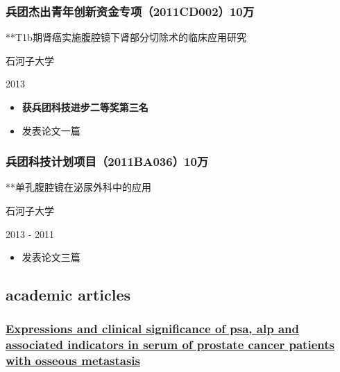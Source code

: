 \documentclass[]{article}
\providecommand{\tightlist}{%
  \setlength{\itemsep}{0pt}\setlength{\parskip}{0pt}}
\begin{document}
\hypertarget{ux5175ux56e2ux6770ux51faux9752ux5e74ux521bux65b0ux8d44ux91d1ux4e13ux98792011cd00210ux4e07}{%
\subsubsection{兵团杰出青年创新资金专项（2011CD002）10万}\label{ux5175ux56e2ux6770ux51faux9752ux5e74ux521bux65b0ux8d44ux91d1ux4e13ux98792011cd00210ux4e07}}

**T1b期肾癌实施腹腔镜下肾部分切除术的临床应用研究

石河子大学

2013

\begin{itemize}
\tightlist
\item
  \textbf{获兵团科技进步二等奖第三名}
\item
  发表论文一篇
\end{itemize}

\hypertarget{ux5175ux56e2ux79d1ux6280ux8ba1ux5212ux9879ux76ee2011ba03610ux4e07}{%
\subsubsection{兵团科技计划项目（2011BA036）10万}\label{ux5175ux56e2ux79d1ux6280ux8ba1ux5212ux9879ux76ee2011ba03610ux4e07}}

**单孔腹腔镜在泌尿外科中的应用

石河子大学

2013 - 2011

\begin{itemize}
\tightlist
\item
  发表论文三篇
\end{itemize}

\hypertarget{academic-articles}{%
\subsection{academic articles}\label{academic-articles}}

\hypertarget{expressions-and-clinical-significance-of-psa-alp-and-associated-indicators-in-serum-of-prostate-cancer-patients-with-osseous-metastasis}{%
\subsubsection{\texorpdfstring{\href{https://doi.org/10.19193/0393-6384_2018_6_279}{Expressions
and clinical significance of psa, alp and associated indicators in serum
of prostate cancer patients with osseous
metastasis}}{Expressions and clinical significance of psa, alp and associated indicators in serum of prostate cancer patients with osseous metastasis}}\label{expressions-and-clinical-significance-of-psa-alp-and-associated-indicators-in-serum-of-prostate-cancer-patients-with-osseous-metastasis}}
\end{document}
